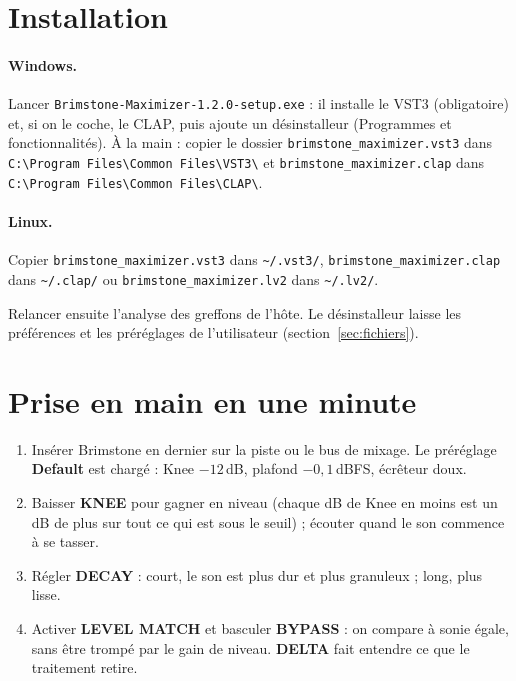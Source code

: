 \documentclass[a4paper,11pt]{article}
\newcommand{\ctl}[1]{\textsf{\textbf{#1}}}   %
\newcommand{\dB}{\,dB}
\newcommand{\dBFS}{\,dBFS}
\begin{document}
\section{Installation}

\paragraph{Windows.} Lancer \texttt{Brimstone-Maximizer-1.2.0-setup.exe} : il installe le VST3
(obligatoire) et, si on le coche, le CLAP, puis ajoute un désinstalleur (\og Programmes et
fonctionnalités\fg). À la main : copier le dossier \texttt{brimstone\_maximizer.vst3} dans
\verb|C:\Program Files\Common Files\VST3\| et \texttt{brimstone\_maximizer.clap} dans
\verb|C:\Program Files\Common Files\CLAP\|.

\paragraph{Linux.} Copier \texttt{brimstone\_maximizer.vst3} dans \verb|~/.vst3/|,
\texttt{brimstone\_maximizer.clap} dans \verb|~/.clap/| ou \texttt{brimstone\_maximizer.lv2}
dans \verb|~/.lv2/|.

Relancer ensuite l'analyse des greffons de l'hôte. Le désinstalleur laisse les préférences et
les préréglages de l'utilisateur (section~\ref{sec:fichiers}).

\section{Prise en main en une minute}

\begin{enumerate}
\item Insérer Brimstone en dernier sur la piste ou le bus de mixage. Le préréglage
  \ctl{Default} est chargé : Knee $-12$\dB, plafond $-0{,}1$\dBFS, écrêteur doux.
\item Baisser \ctl{KNEE} pour gagner en niveau (chaque dB de Knee en moins est un dB de plus sur
  tout ce qui est sous le seuil) ; écouter quand le son commence à se tasser.
\item Régler \ctl{DECAY} : court, le son est plus dur et plus granuleux ; long, plus lisse.
\item Activer \ctl{LEVEL MATCH} et basculer \ctl{BYPASS} : on compare à sonie égale, sans
  être trompé par le gain de niveau. \ctl{DELTA} fait entendre ce que le traitement retire.
\end{enumerate}
\end{document}
